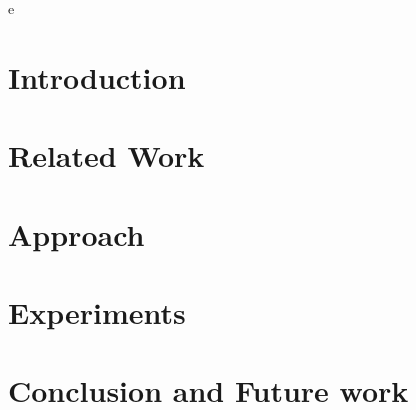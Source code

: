 \documentclass[12pt,twoside,openright]{report}
\makeatletter
\def\cleardoublepage{\clearpage\if@twoside \ifodd\c@page\else
    \hbox{}
    \thispagestyle{empty}
    \newpage
    \if@twocolumn\hbox{}\newpage\fi\fi\fi}
\makeatother
\begin{document}

\cleardoublepage


%

e
\cleardoublepage


\tableofcontents

\chapter{Introduction}


\chapter{Related Work}


\chapter{Approach}


\chapter{Experiments}


%

\chapter{Conclusion and Future work}





%

%
%
%
\end{document}
